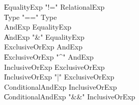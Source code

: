\begin{grammar}
    \|   EqualityExp  \xcd"!="  RelationalExp\\
    \|   Type    \xcd"=="  Type  \\
 AndExp  \:   EqualityExp\\
    \|   AndExp  \xcd"&"  EqualityExp\\
 ExclusiveOrExp  \:   AndExp\\
    \|   ExclusiveOrExp  \xcd"^"  AndExp\\
 InclusiveOrExp  \:   ExclusiveOrExp\\
    \|   InclusiveOrExp  \xcd"|"  ExclusiveOrExp\\
 ConditionalAndExp  \:   InclusiveOrExp\\
    \|   ConditionalAndExp  \xcd"&&"  InclusiveOrExp\\
\end{grammar}

